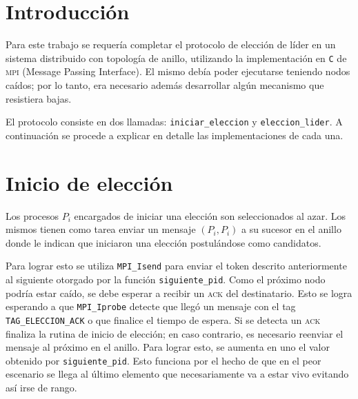 \documentclass[a4paper]{article}
\newcommand{\acr}[1]{\textsc{\lowercase{#1}}}
\begin{document}

\maketitle
\thispagestyle{empty}

\newpage
\section{Introducción}

Para este trabajo se requería completar el protocolo de elección de líder en un
sistema distribuido con topología de anillo, utilizando la implementación en
\texttt{C} de \acr{MPI} (Message Passing Interface). El mismo debía poder
ejecutarse teniendo nodos caídos; por lo tanto, era necesario además
desarrollar algún mecanismo que resistiera bajas.

El protocolo consiste en dos llamadas: \texttt{iniciar\_eleccion} y
\texttt{eleccion\_lider}. A continuación se procede a explicar en detalle las
implementaciones de cada una.

\section{Inicio de elección}

Los procesos $P_i$ encargados de iniciar una elección son seleccionados al azar. Los
mismos tienen como tarea enviar un mensaje $(P_i, P_i)$ a su sucesor en el
anillo donde le indican que iniciaron una elección postulándose como
candidatos.

Para lograr esto se utiliza \texttt{MPI\_Isend} para enviar el token descrito
anteriormente al siguiente otorgado por la función \texttt{siguiente\_pid}.
Como el próximo nodo podría estar caído, se debe esperar a recibir un
\acr{ACK} del destinatario. Esto se logra esperando a que
\texttt{MPI\_Iprobe} detecte que llegó un mensaje con el tag
\texttt{TAG\_ELECCION\_ACK} o que finalice el tiempo de espera. Si se detecta un
\acr{ACK} finaliza la rutina de inicio de elección; en caso contrario, es
necesario reenviar el mensaje al próximo en el anillo. Para lograr esto, se
aumenta en uno el valor obtenido por \texttt{siguiente\_pid}. Esto funciona por
el hecho de que en el peor escenario se llega al último elemento que
necesariamente va a estar vivo evitando así irse de rango.
\end{document}
